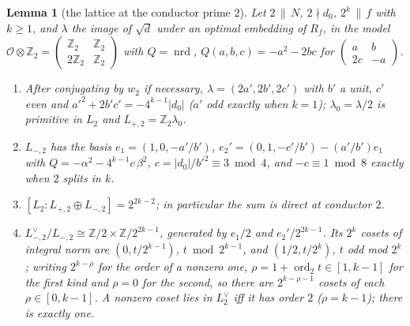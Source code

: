 \documentclass[11pt,reqno]{amsart}
\theoremstyle{plain}
\newtheorem{lemma}[theorem]{Lemma}
\theoremstyle{definition}
\DeclareMathOperator{\ord}{ord}
\DeclareMathOperator{\nrd}{nrd}
\newcommand{\Z}{\mathbb{Z}}
\begin{document}
\begin{lemma}[the lattice at the conductor prime $2$]\label{lem:conductor2}
Let $2\,\|\,N$, $2\nmid d_0$, $2^k\,\|\,f$ with $k\ge1$, and $\lambda$ the image of $\sqrt d$ under an
optimal embedding of $R_f$, in the model $\mathcal O\otimes\Z_2=\begin{pmatrix}\Z_2&\Z_2\\2\Z_2&\Z_2
\end{pmatrix}$ with $Q=\nrd$, $Q(a,b,c)=-a^2-2bc$ for $\begin{pmatrix}a&b\\2c&-a\end{pmatrix}$.
\begin{enumerate}
\item After conjugating by $w_2$ if necessary, $\lambda=(2a',2b',2c')$ with $b'$ a unit, $c'$ even
      and $a'^2+2b'c'=-4^{k-1}\lvert d_0\rvert$ ($a'$ odd exactly when $k=1$); $\lambda_0=\lambda/2$
      is primitive in $L_2$ and $L_{+,2}=\Z_2\lambda_0$.
\item $L_{-,2}$ has the basis $e_1=(1,0,-a'/b')$, $e_2'=(0,1,-c'/b')-(a'/b')e_1$ with
      $Q=-\alpha^2-4^{k-1}c\,\beta^2$, $c=\lvert d_0\rvert/b'^2\equiv3\bmod4$, and $-c\equiv1\bmod8$
      exactly when $2$ splits in $k$.
\item $[L_2:L_{+,2}\oplus L_{-,2}]=2^{2k-2}$; in particular the sum is direct at conductor $2$.
\item $L_{-,2}^\vee/L_{-,2}\cong\Z/2\times\Z/2^{2k-1}$, generated by $e_1/2$ and $e_2'/2^{2k-1}$. Its
      $2^k$ cosets of integral norm are $(0,t/2^{k-1})$, $t\bmod2^{k-1}$, and $(1/2,t/2^k)$, $t$ odd
      mod $2^k$; writing $2^{k-\rho}$ for the order of a nonzero one, $\rho=1+\ord_2t\in[1,k-1]$ for
      the first kind and $\rho=0$ for the second, so there are $2^{k-\rho-1}$ cosets of each
      $\rho\in[0,k-1]$. A nonzero coset lies in $L_2^\vee$ iff it has order $2$ ($\rho=k-1$); there is
      exactly one.
\end{enumerate}
\end{lemma}
\end{document}
